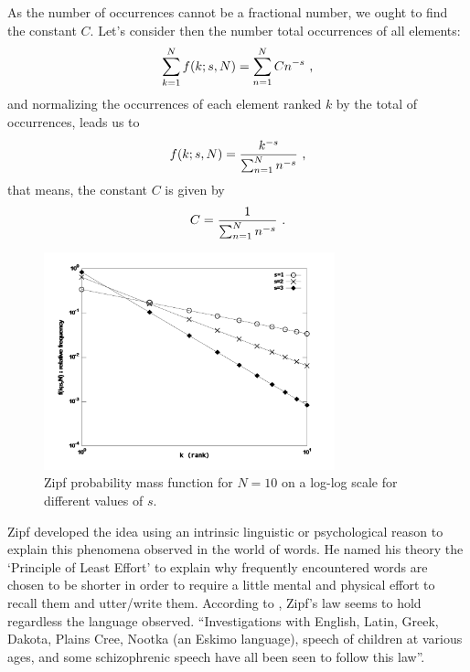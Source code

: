 As the number of occurrences cannot be a fractional number, we ought to find the constant $C$. Let's consider then the number total occurrences of all elements:
\begin{equation}
\sum_{k=1}^{N} f(k;s,N) = \sum_{n=1}^{N} C n^{-s} \textmd{ ,}
\end{equation}
and normalizing the occurrences of each element ranked $k$ by the total of occurrences, leads us to
\begin{equation}
\label{eq:zipflaw}
f(k;s,N) = \frac{k^{-s}}{\sum_{n=1}^{N} n^{-s}} \textmd{ ,}
\end{equation}
that means, the constant $C$ is given by
\begin{equation}
C = \frac{1}{\sum_{n=1}^{N} n^{-s}} \textmd{ .}
\end{equation}

\begin{figure}[h!]
\centering
\includegraphics[width=0.75\textwidth]{images/zipf_pmf.pdf}
\caption{Zipf probability mass function for $N=10$ on a log-log scale for different values of $s$.}
\label{fig:zipf_pmf}
\end{figure} 

Zipf developed the idea using an intrinsic linguistic or psychological reason to explain this phenomena observed in the world of words. He named his theory the `Principle of Least Effort' to explain why frequently encountered words are chosen to be shorter in order to require a little mental and physical effort to recall them and utter/write them. According to \cite{weiss1998}, Zipf's law seems to hold regardless the language observed. ``Investigations with English, Latin, Greek, Dakota, Plains Cree, Nootka (an Eskimo language), speech of children at various ages, and some schizophrenic speech have all been seen to follow this law''\citep{weiss1998}.

